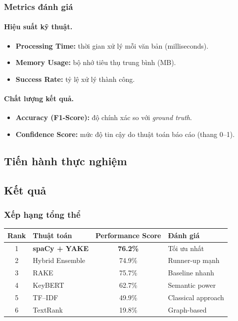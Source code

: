 \subsubsection{Metrics đánh giá}

\paragraph{Hiệu suất kỹ thuật.}
\begin{itemize}
  \item \textbf{Processing Time:} thời gian xử lý mỗi văn bản (milliseconds).
  \item \textbf{Memory Usage:} bộ nhớ tiêu thụ trung bình (MB).
  \item \textbf{Success Rate:} tỷ lệ xử lý thành công.
\end{itemize}

\paragraph{Chất lượng kết quả.}
\begin{itemize}
  \item \textbf{Accuracy (F1-Score):} độ chính xác so với \textit{ground truth}.
  \item \textbf{Confidence Score:} mức độ tin cậy do thuật toán báo cáo (thang 0--1).
\end{itemize}

\subsection{Tiến hành thực nghiệm}


\subsection{Kết quả}

\subsubsection{Xếp hạng tổng thể}



\begin{table}[h]
\centering
\begin{tabular}{c l c l}
\toprule
\textbf{Rank} & \textbf{Thuật toán} & \textbf{Performance Score} & \textbf{Đánh giá} \\
\midrule
1 & \textbf{spaCy + YAKE} & \textbf{76.2\%} & Tối ưu nhất \\
2 & Hybrid Ensemble        & 74.9\%          & Runner-up mạnh \\
3 & RAKE                   & 75.7\%          & Baseline nhanh \\
4 & KeyBERT                & 62.7\%          & Semantic power \\
5 & TF--IDF                & 49.9\%          & Classical approach \\
6 & TextRank               & 19.8\%          & Graph-based \\
\bottomrule
\end{tabular}
\end{table}

